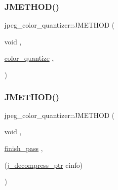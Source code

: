 \subsubsection{\texorpdfstring{JMETHOD()}{JMETHOD()}\hspace{0.1cm}{\footnotesize\ttfamily [2/4]}}
{\footnotesize\ttfamily jpeg\+\_\+color\+\_\+quantizer\+::\+J\+M\+E\+T\+H\+OD (\begin{DoxyParamCaption}\item[{void}]{,  }\item[{\mbox{\hyperlink{jquant1_8c_a7cd0ab37d067e082d52761a72a34f393}{color\+\_\+quantize}}}]{,  }\item[{(\mbox{\hyperlink{jpeglib_8h_a00c7d78af44bd26a901c791ccfc1e178}{j\+\_\+decompress\+\_\+ptr}} cinfo, \mbox{\hyperlink{jpeglib_8h_ac9d5d1b829ed51769db69a37271a7e91}{J\+S\+A\+M\+P\+A\+R\+R\+AY}} input\+\_\+buf, \mbox{\hyperlink{jpeglib_8h_ac9d5d1b829ed51769db69a37271a7e91}{J\+S\+A\+M\+P\+A\+R\+R\+AY}} \mbox{\hyperlink{jdct_8h_ad7e4660a191b1a791748dd44d5a7a0ec}{output\+\_\+buf}}, int \mbox{\hyperlink{jpegint_8h_ac5f8b57092da0f421713ba171c4c9f87}{num\+\_\+rows}})}]{ }\end{DoxyParamCaption})}

\mbox{\label{structjpeg__color__quantizer_abb5268c27447bc9ae1876c5fffa94081}} 
\subsubsection{\texorpdfstring{JMETHOD()}{JMETHOD()}\hspace{0.1cm}{\footnotesize\ttfamily [3/4]}}
{\footnotesize\ttfamily jpeg\+\_\+color\+\_\+quantizer\+::\+J\+M\+E\+T\+H\+OD (\begin{DoxyParamCaption}\item[{void}]{,  }\item[{\mbox{\hyperlink{jcarith_8c_a3098c13232c4cb8675f1f35a80aa5944}{finish\+\_\+pass}}}]{,  }\item[{(\mbox{\hyperlink{jpeglib_8h_a00c7d78af44bd26a901c791ccfc1e178}{j\+\_\+decompress\+\_\+ptr}} cinfo)}]{ }\end{DoxyParamCaption})}

\mbox{\label{structjpeg__color__quantizer_a9531395d8c6f914f57bea01ff2b2c5b4}} 
